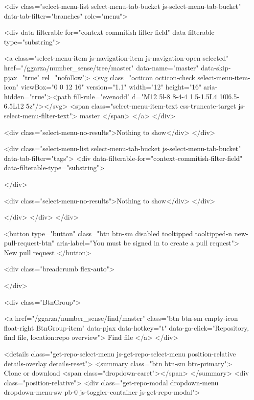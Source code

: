       <div class="select-menu-list select-menu-tab-bucket js-select-menu-tab-bucket" data-tab-filter="branches" role="menu">

        <div data-filterable-for="context-commitish-filter-field" data-filterable-type="substring">


            <a class="select-menu-item js-navigation-item js-navigation-open selected"
               href="/ggarza/number_sense/tree/master"
               data-name="master"
               data-skip-pjax="true"
               rel="nofollow">
              <svg class="octicon octicon-check select-menu-item-icon" viewBox="0 0 12 16" version="1.1" width="12" height="16" aria-hidden="true"><path fill-rule="evenodd" d="M12 5l-8 8-4-4 1.5-1.5L4 10l6.5-6.5L12 5z"/></svg>
              <span class="select-menu-item-text css-truncate-target js-select-menu-filter-text">
                master
              </span>
            </a>
        </div>

          <div class="select-menu-no-results">Nothing to show</div>
      </div>

      <div class="select-menu-list select-menu-tab-bucket js-select-menu-tab-bucket" data-tab-filter="tags">
        <div data-filterable-for="context-commitish-filter-field" data-filterable-type="substring">


        </div>

        <div class="select-menu-no-results">Nothing to show</div>
      </div>

    </div>
  </div>
</div>


        <button type="button" class="btn btn-sm disabled tooltipped tooltipped-n new-pull-request-btn" aria-label="You must be signed in to create a pull request">
          New pull request
        </button>

  <div class="breadcrumb flex-auto">
    
  </div>

  <div class="BtnGroup">

    <a href="/ggarza/number_sense/find/master"
      class="btn btn-sm empty-icon float-right BtnGroup-item"
      data-pjax
      data-hotkey="t"
      data-ga-click="Repository, find file, location:repo overview">
      Find file
    </a>
  </div>
  

    <details class="get-repo-select-menu js-get-repo-select-menu position-relative details-overlay details-reset">
  <summary class="btn btn-sm btn-primary">
    Clone or download
    <span class="dropdown-caret"></span>
  </summary>
  <div class="position-relative">
    <div class="get-repo-modal dropdown-menu dropdown-menu-sw pb-0 js-toggler-container  js-get-repo-modal">

